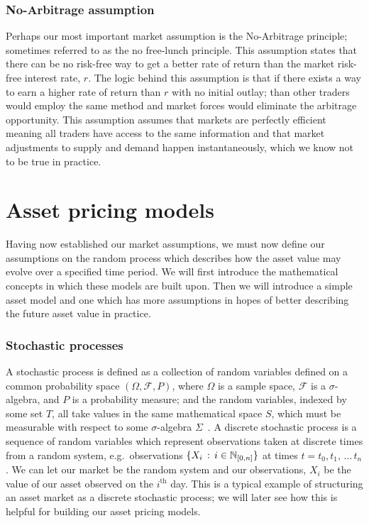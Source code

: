 \subsubsection{No-Arbitrage assumption}

Perhaps our most important market assumption is the No-Arbitrage principle; sometimes referred to as the no free-lunch principle. This assumption states that there can be no risk-free way to get a better rate of return than the market risk-free interest rate, \(r\). The logic behind this assumption is that if there exists a way to earn a higher rate of return than \(r\) with no initial outlay; than other traders would employ the same method and market forces would eliminate the arbitrage opportunity. This assumption assumes that markets are perfectly efficient meaning all traders have access to the same information and that market adjustments to supply and demand happen instantaneously, which we know not to be true in practice.

\section{Asset pricing models}

Having now established our market assumptions, we must now define our assumptions on the random process which describes how the asset value may evolve over a specified time period. We will first introduce the mathematical concepts in which these models are built upon. Then we will introduce a simple asset model and one which has more assumptions in hopes of better describing the future asset value in practice.

\subsubsection{Stochastic processes}

A stochastic process is defined as a collection of random variables defined on a common probability space \( (\Omega ,\mathcal{F},P) \), where \( \Omega \)  is a sample space, \( \mathcal{F} \) is a \( \sigma \)-algebra, and \( P \) is a probability measure; and the random variables, indexed by some set \( T \), all take values in the same mathematical space \(S\), which must be measurable with respect to some \( \sigma \)-algebra \( \Sigma \)~\cite{lamperti1977stochastic}.
\nline{}
A discrete stochastic process is a sequence of random variables which represent observations taken at discrete times from a random system, e.g.\ observations \( \{X_i\,:\, i \in \mathbb{N}_{[0,n]}\} \) at times \( t = t_0,t_1,\,\dots \,t_n \). We can let our market be the random system and our observations, \( X_i \) be the value of our asset observed on the \( i^\text{th}\) day. This is a typical example of structuring an asset market as a discrete stochastic process; we will later see how this is helpful for building our asset pricing models.

